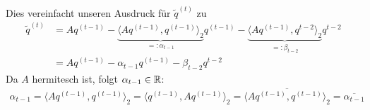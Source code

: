 Dies vereinfacht unseren Ausdruck für $\tilde{q}^{(t)}$ zu
%
\begin{align*}
  \tilde{q}^{(t)} 
  &= Aq^{(t-1)} - \underbrace{\langle Aq^{(t-1)}, q^{(t-1)}\rangle_2}_{=:\alpha_{t-1}} q^{(t-1)}
  - \underbrace{\langle Aq^{(t-1)}, q^{t-2}\rangle_2}_{=:\beta_{t-2}} q^{t-2} \\
  &= Aq^{(t-1)}-\alpha_{t-1}q^{(t-1)}-\beta_{t-2}q^{t-2}
  \tag{1}\label{eq:lanczosEQ1}
\end{align*}
%
Da $A$ hermitesch ist, folgt $\alpha_{t-1}\in\mathbb R$:
%
\begin{align*}
  \alpha_{t-1}  
  = \langle Aq^{(t-1)}, q^{(t-1)}\rangle_2 
  = \langle q^{(t-1)}, Aq^{(t-1)}\rangle_2 
  = \overline{\langle Aq^{(t-1)}, q^{(t-1)}\rangle_2 }
  = \overline{\alpha_{t-1}}
\end{align*}
%


